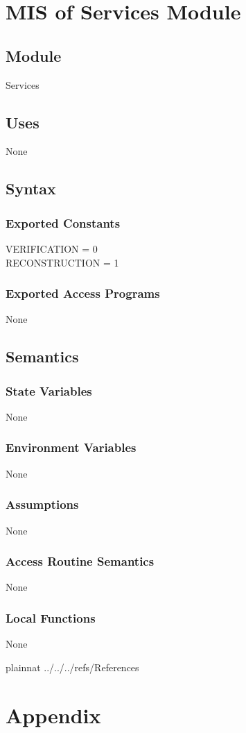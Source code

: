 \documentclass[12pt, titlepage]{article}
\begin{document}
\newpage
\section{MIS of Services Module} \label{ModuleCon}

\subsection{Module}
Services

\subsection{Uses}
None

\subsection{Syntax}

\subsubsection{Exported Constants}
VERIFICATION = 0\\
RECONSTRUCTION = 1\\

\subsubsection{Exported Access Programs}
None

\subsection{Semantics}

\subsubsection{State Variables}
None

\subsubsection{Environment Variables}
None

\subsubsection{Assumptions}
None

\subsubsection{Access Routine Semantics}
None

\subsubsection{Local Functions}
None

\newpage

 {plainnat}
 {../../../refs/References}

\newpage

\section{Appendix} \label{Appendix}

\end{document}
